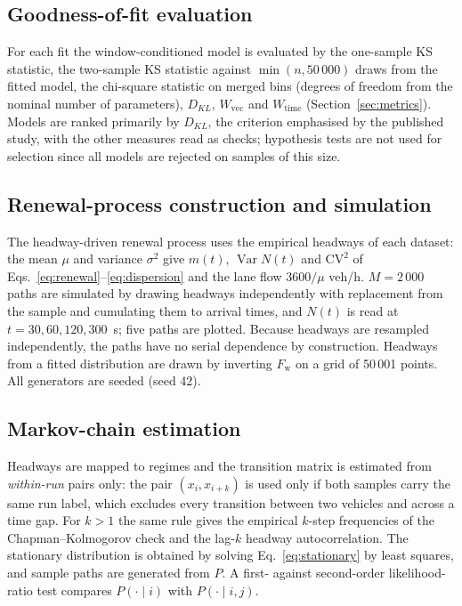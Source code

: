 \documentclass[10pt,a4paper]{article}
\numberwithin{equation}{section}
\newcommand{\Var}{\operatorname{Var}}
\newcommand{\Wvec}{W_{\mathrm{vec}}}
\newcommand{\Wtime}{W_{\mathrm{time}}}
\begin{document}
\subsection{Goodness-of-fit evaluation}
For each fit the window-conditioned model is evaluated by the one-sample KS statistic, the two-sample KS statistic against $\min(n,50\,000)$ draws from the fitted model, the chi-square statistic on merged bins (degrees of freedom from the nominal number of parameters), $D_{KL}$, $\Wvec$ and $\Wtime$ (Section~\ref{sec:metrics}).
Models are ranked primarily by $D_{KL}$, the criterion emphasised by the published study, with the other measures read as checks; hypothesis tests are not used for selection since all models are rejected on samples of this size.

\subsection{Renewal-process construction and simulation}
The headway-driven renewal process uses the empirical headways of each dataset: the mean $\mu$ and variance $\sigma^2$ give $m(t)$, $\Var N(t)$ and $\mathrm{CV}^2$ of Eqs.~\eqref{eq:renewal}--\eqref{eq:dispersion} and the lane flow $3600/\mu$ veh/h.
$M=2\,000$ paths are simulated by drawing headways independently with replacement from the sample and cumulating them to arrival times, and $N(t)$ is read at $t=30,60,120,300$~s; five paths are plotted. Because headways are resampled independently, the paths have no serial dependence by construction.
Headways from a fitted distribution are drawn by inverting $F_{\mathrm w}$ on a grid of 50\,001 points. All generators are seeded (seed 42).

\subsection{Markov-chain estimation}\label{sec:markovmethod}
Headways are mapped to regimes and the transition matrix is estimated from \emph{within-run} pairs only: the pair $(x_i,x_{i+k})$ is used only if both samples carry the same run label, which excludes every transition between two vehicles and across a time gap.
For $k>1$ the same rule gives the empirical $k$-step frequencies of the Chapman--Kolmogorov check and the lag-$k$ headway autocorrelation. The stationary distribution is obtained by solving Eq.~\eqref{eq:stationary} by least squares, and sample paths are generated from $P$.
A first- against second-order likelihood-ratio test compares $P(\cdot\mid i)$ with $P(\cdot\mid i,j)$.
\end{document}
